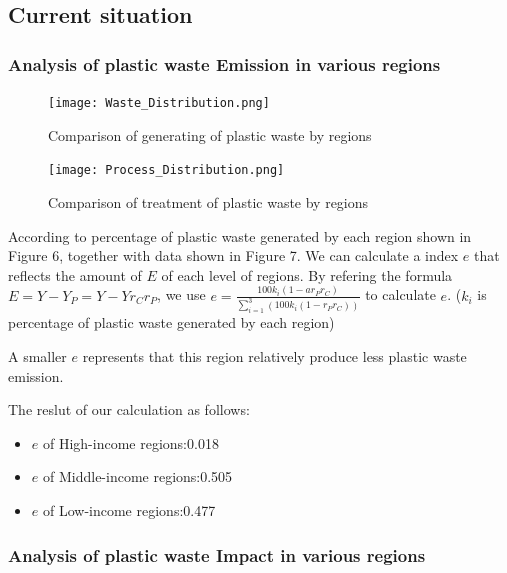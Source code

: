 \documentclass{mcmthesis}
\begin{document}
	 
  \subsection{Current situation}
   \subsubsection{Analysis of plastic waste Emission in various regions}
	\begin{figure}[H]
	 \centering
	  \texttt{[image: Waste\_Distribution.png]}
     \caption{Comparison of generating of plastic waste by regions}
	\end{figure} 
	\begin{figure}[H]
		\centering
		 \texttt{[image: Process\_Distribution.png]}
		\caption{Comparison of treatment of plastic waste by regions}
	   \end{figure}
	   According to percentage of plastic waste generated by each region shown in Figure 6, together with data shown in Figure 7. We can calculate a index $e$ that reflects the amount of $E$ of each level of regions. By refering the formula $E=Y-Y_P=Y-Yr_Cr_P$, we use 
	   $e=\frac{100k_i(1-ar_Pr_C)}{\sum_{i=1}^3(100k_i(1-r_Pr_C))}$ to calculate $e$. ($k_i$ is percentage of plastic waste generated by each region) 
	   
	   A smaller $e$ represents that this region relatively produce less plastic waste emission.

	  The reslut of our calculation as follows: 
	  \begin{itemize}
       \item \quad $e$ of High-income regions:0.018
       \item \quad $e$ of Middle-income regions:0.505
       \item \quad $e$ of Low-income regions:0.477
      
	  \end{itemize}
   \subsubsection{Analysis of plastic waste Impact in various regions}
   
\end{document}
